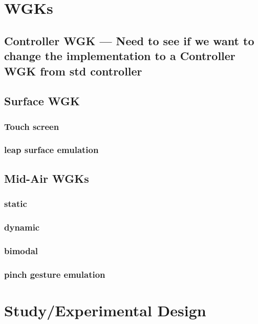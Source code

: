 \section{WGKs}

\subsection{Controller WGK --- Need to see if we want to change the implementation to a Controller WGK from std controller}

\subsection{Surface WGK}

\subsubsection{Touch screen}

\subsubsection{leap surface emulation}

\subsection{Mid-Air WGKs}

\subsubsection{static}

\subsubsection{dynamic}

\subsubsection{bimodal}

\subsubsection{pinch gesture emulation}

\section{Study/Experimental Design}
